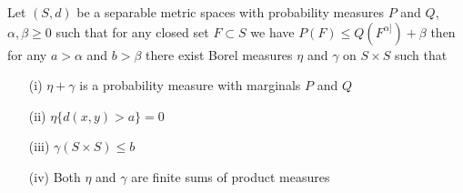 \begin{thm}\label{StrassenPlus}Let $(S,d)$ be a separable metric spaces with probability measures $P$ and $Q$, $\alpha, \beta \geq 0$ such that for any closed set $F \subset S$ we have $P(F) \leq Q(F^{\alpha]}) + \beta$ then for any $a > \alpha$ and $b > \beta$ there exist Borel measures $\eta$ and $\gamma$ on $S \times S$ such that
\begin{itemize}
\item[(i)] $\eta + \gamma$ is a probability measure with marginals $P$ and $Q$
\item[(ii)] $\eta \lbrace d(x,y) > a \rbrace = 0$
\item[(iii)] $\gamma(S \times S) \leq b$
\item[(iv)] Both $\eta$ and $\gamma$ are finite sums of product measures
\end{itemize}
\end{thm}
